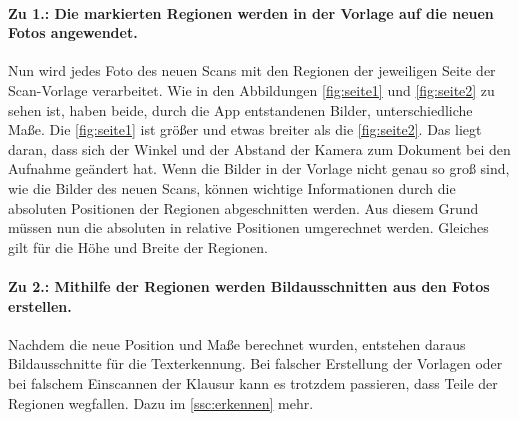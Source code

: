 \documentclass[notables, nomenclature, oneside, 150]{HSMW-Thesis}
\begin{document}
				\paragraph*{Zu 1.: Die markierten Regionen werden in der Vorlage auf die neuen Fotos angewendet.}
					Nun wird jedes Foto des neuen Scans mit den Regionen der jeweiligen Seite der Scan-Vorlage verarbeitet. 
					Wie in den Abbildungen \ref{fig:seite1} und \ref{fig:seite2} zu sehen ist, haben beide, durch die App entstandenen Bilder, unterschiedliche Maße. Die \autoref{fig:seite1} ist größer und etwas breiter als die \autoref{fig:seite2}. Das liegt daran, dass sich der Winkel und der Abstand der Kamera zum Dokument bei den Aufnahme geändert hat. Wenn die Bilder in der Vorlage nicht genau so groß sind, wie die Bilder des neuen Scans, können wichtige Informationen durch die absoluten Positionen der Regionen abgeschnitten werden. Aus diesem Grund müssen nun die absoluten in relative Positionen umgerechnet werden. Gleiches gilt für die Höhe und Breite der Regionen.

				\paragraph*{Zu 2.: Mithilfe der Regionen werden Bildausschnitten aus den Fotos erstellen.}
					Nachdem die neue Position und Maße berechnet wurden, entstehen daraus Bildausschnitte für die Texterkennung. 
					Bei falscher Erstellung der Vorlagen oder bei falschem Einscannen der Klausur kann es trotzdem passieren, dass Teile der Regionen wegfallen. Dazu im \autoref{ssc:erkennen} mehr.
				
\end{document}
